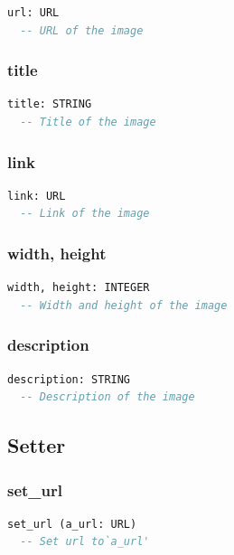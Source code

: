\begin{lstlisting}[language=Eiffel]
url: URL
  -- URL of the image
\end{lstlisting}

\subsubsection{title}

\begin{lstlisting}[language=Eiffel]
title: STRING
  -- Title of the image
\end{lstlisting}

\subsubsection{link}

\begin{lstlisting}[language=Eiffel]
link: URL
  -- Link of the image
\end{lstlisting}

\subsubsection{width, height}

\begin{lstlisting}[language=Eiffel]
width, height: INTEGER
  -- Width and height of the image
\end{lstlisting}

\subsubsection{description}

\begin{lstlisting}[language=Eiffel]
description: STRING
  -- Description of the image
\end{lstlisting}

\subsection{Setter}
\label{sec:channel-image-setter}

\subsubsection{set\_url}

\begin{lstlisting}[language=Eiffel]
set_url (a_url: URL)
  -- Set url to`a_url'
\end{lstlisting}


